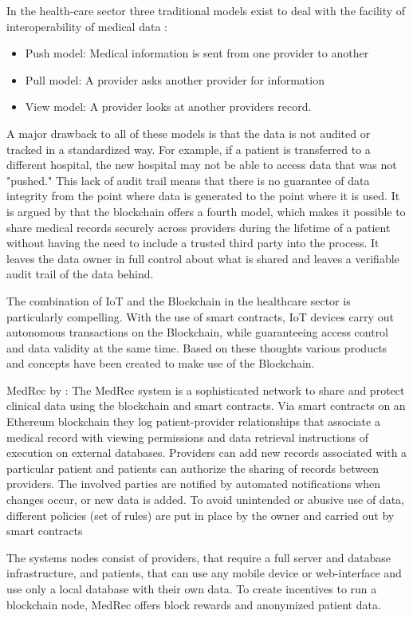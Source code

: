In the health-care sector three traditional models exist to deal with the facility of interoperability of medical data \cite{Kshetri2017}:
\begin{itemize}
    \item Push model: Medical information is sent from one provider to another
    \item Pull model: A provider asks another provider for information
    \item View model: A provider looks at another providers record.
\end{itemize}
A major drawback to all of these models is that the data is not audited or tracked in a standardized way. For example, if a patient is transferred to a different hospital, the new hospital may not be able to access data that was not "pushed." This lack of audit trail means that there is no guarantee of data integrity from the point where data is generated to the point where it is used.
It is argued by \cite{Kshetri2017} that the blockchain offers a fourth model, which makes it possible to share medical records securely across providers during the lifetime of a patient without having the need to include a trusted third party into the process. It leaves the data owner in full control about what is shared and leaves a verifiable audit trail of the data behind.

The combination of IoT and the Blockchain in the healthcare sector is particularly compelling. With the use of smart contracts, IoT devices carry out autonomous transactions on the Blockchain, while guaranteeing access control and data validity at the same time. Based on these thoughts various products and concepts have been created to make use of the Blockchain.


MedRec by \citeauthor{Azaria2016}:
The MedRec system is a sophisticated network to share and protect clinical data using the blockchain and smart contracts. Via smart contracts on an Ethereum blockchain they log patient-provider relationships that associate a medical record with viewing permissions and data retrieval instructions of execution on external databases.
Providers can add new records associated with a particular patient and patients can authorize the sharing of records between providers. The involved parties are notified by automated notifications when changes occur, or new data is added.
To avoid unintended or abusive use of data, different policies (set of rules) are put in place by the owner and carried out by smart contracts

The systems nodes consist of providers, that require a full server and database infrastructure, and patients, that can use any mobile device or web-interface and use only a local database with their own data.
To create incentives to run a blockchain node, MedRec offers block rewards and anonymized patient data.


